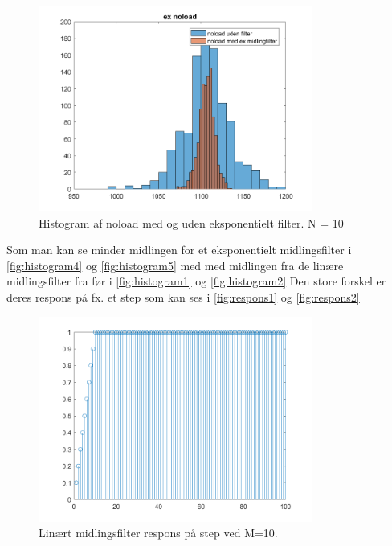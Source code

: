 \documentclass[12pt]{article}
\begin{document}
\begin{figure}[H]
	\centering
	\includegraphics[width=90mm]{Img/Histogram_noload_ex10.png}
	\caption{Histogram af noload med og uden eksponentielt filter. N = 10}
	\label{fig:histogram5}
\end{figure}

Som man kan se minder midlingen  for et eksponentielt midlingsfilter i \autoref{fig:histogram4} og \autoref{fig:histogram5} med med midlingen fra de linære midlingsfilter fra før i \autoref{fig:histogram1} og \autoref{fig:histogram2}
\newline
Den store forskel er deres respons på fx. et step som kan ses i \autoref{fig:respons1} og \autoref{fig:respons2}

\begin{figure}[H]
	\centering
	\includegraphics[width=90mm]{Img/respons_alm.png}
	\caption{Linært midlingsfilter respons på step ved M=10.}
	\label{fig:respons1}
\end{figure}
\end{document}
